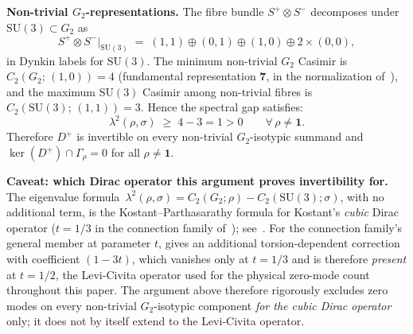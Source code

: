 \documentclass[12pt,a4paper]{article}
\begin{document}
\textbf{Non-trivial $G_2$-representations.}
The fibre bundle $S^+\otimes S^-$ decomposes under $\mathrm{SU}(3)\subset G_2$ as
\[
  S^+\otimes S^-\big|_{\mathrm{SU}(3)} \;=\;
  (1,1)\oplus(0,1)\oplus(1,0)\oplus 2\times(0,0),
\]
in Dynkin labels for $\mathrm{SU}(3)$.
The minimum non-trivial $G_2$ Casimir is $C_2(G_2;\,(1,0))=4$ (fundamental representation
$\mathbf{7}$, in the normalization of~\cite{Agricola2002}),
and the maximum $\mathrm{SU}(3)$ Casimir among non-trivial fibres is $C_2(\mathrm{SU}(3);\,(1,1))=3$.
Hence the spectral gap satisfies:
\[
  \lambda^2(\rho,\sigma) \;\geq\; 4 - 3 = 1 > 0
  \qquad\forall\, \rho\neq\mathbf{1}.
\]
Therefore $D^+$ is invertible on every non-trivial $G_2$-isotypic summand and
$\ker(D^+)\cap\Gamma_\rho = 0$ for all $\rho\neq\mathbf{1}$.

\textbf{Caveat: which Dirac operator this argument proves invertibility for.}
The eigenvalue formula~$\lambda^2(\rho,\sigma)=C_2(G_2;\rho)-C_2(\mathrm{SU}(3);\sigma)$, with
no additional term, is the Kostant--Parthasarathy formula for Kostant's \emph{cubic} Dirac
operator ($t=1/3$ in the connection family of~\cite{Agricola2002}); see~\cite[Thm.~3.3]{Agricola2002}.
For the connection family's general member at parameter $t$, \cite[Thm.~3.2]{Agricola2002} gives an
additional torsion-dependent correction with coefficient $(1-3t)$, which vanishes only at $t=1/3$
and is therefore \emph{present} at $t=1/2$, the Levi-Civita operator used for the physical
zero-mode count throughout this paper. The argument above therefore rigorously excludes zero modes
on every non-trivial $G_2$-isotypic component \emph{for the cubic Dirac operator} only; it does not
by itself extend to the Levi-Civita operator.
\end{document}
